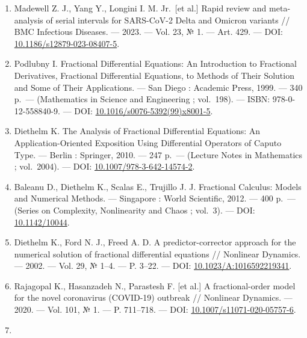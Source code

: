 \documentclass[12pt]{article}
\begin{document}
\begin{enumerate}
  \begin{enumerate}
  \def\labelenumii{\arabic{enumii}.}
  \setcounter{enumii}{4}
  \tightlist
  \item
    --- Vol. 21, № 1. --- Art. 374. --- DOI:
    \href{https://doi.org/10.1186/s12916-023-03070-8}{10.1186/s12916-023-03070-8}.
  \end{enumerate}
\item
  Madewell Z. J., Yang Y., Longini I. M. Jr.~{[}et al.{]} Rapid review
  and meta-analysis of serial intervals for SARS-CoV-2 Delta and Omicron
  variants // BMC Infectious Diseases. --- 2023. --- Vol. 23, № 1. ---
  Art. 429. --- DOI:
  \href{https://doi.org/10.1186/s12879-023-08407-5}{10.1186/s12879-023-08407-5}.
\item
  Podlubny I. Fractional Differential Equations: An Introduction to
  Fractional Derivatives, Fractional Differential Equations, to Methods
  of Their Solution and Some of Their Applications. --- San Diego :
  Academic Press, 1999. --- 340 p.~--- (Mathematics in Science and
  Engineering ; vol.~198). --- ISBN: 978-0-12-558840-9. --- DOI:
  \href{https://doi.org/10.1016/s0076-5392(99)x8001-5}{10.1016/s0076-5392(99)x8001-5}.
\item
  Diethelm K. The Analysis of Fractional Differential Equations: An
  Application-Oriented Exposition Using Differential Operators of Caputo
  Type. --- Berlin : Springer, 2010. --- 247 p.~--- (Lecture Notes in
  Mathematics ; vol.~2004). --- DOI:
  \href{https://doi.org/10.1007/978-3-642-14574-2}{10.1007/978-3-642-14574-2}.
\item
  Baleanu D., Diethelm K., Scalas E., Trujillo J. J. Fractional
  Calculus: Models and Numerical Methods. --- Singapore : World
  Scientific, 2012. --- 400 p.~--- (Series on Complexity, Nonlinearity
  and Chaos ; vol.~3). --- DOI:
  \href{https://doi.org/10.1142/10044}{10.1142/10044}.
\item
  Diethelm K., Ford N. J., Freed A. D. A predictor-corrector approach
  for the numerical solution of fractional differential equations //
  Nonlinear Dynamics. --- 2002. --- Vol. 29, № 1--4. --- P. 3--22. ---
  DOI:
  \href{https://doi.org/10.1023/A:1016592219341}{10.1023/A:1016592219341}.
\item
  Rajagopal K., Hasanzadeh N., Parastesh F. {[}et al.{]} A
  fractional-order model for the novel coronavirus (COVID-19) outbreak
  // Nonlinear Dynamics. --- 2020. --- Vol. 101, № 1. --- P. 711--718.
  --- DOI:
  \href{https://doi.org/10.1007/s11071-020-05757-6}{10.1007/s11071-020-05757-6}.
\item

\end{enumerate}
\end{document}
